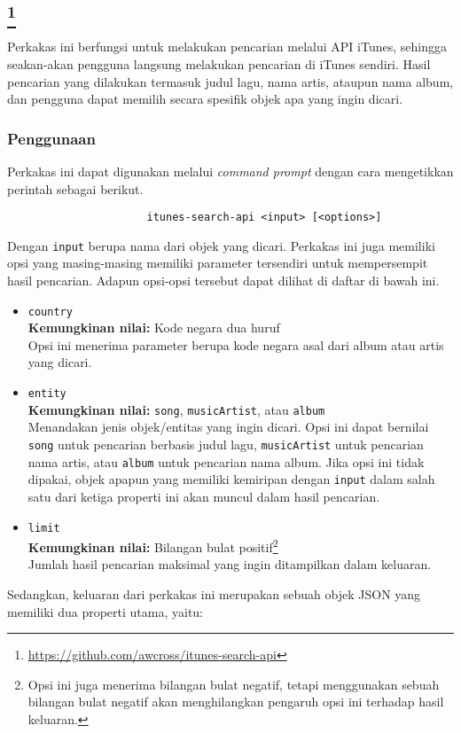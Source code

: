 \subsection{\itunesapi\footnote{\href{https://github.com/awcross/itunes-search-api}{https://github.com/awcross/itunes-search-api}}}
\label{sec:similarapps-itunesapi}

Perkakas \cl ini berfungsi untuk melakukan pencarian melalui API iTunes, sehingga seakan-akan pengguna langsung melakukan pencarian di iTunes sendiri. Hasil pencarian yang dilakukan termasuk judul lagu, nama artis, ataupun nama album, dan pengguna dapat memilih secara spesifik objek apa yang ingin dicari.

\subsubsection{Penggunaan}
\label{sec:similarapps-itunesapi-usage}

Perkakas ini dapat digunakan melalui \textit{command prompt} dengan cara mengetikkan perintah sebagai berikut.

\begin{verbatim}
                      itunes-search-api <input> [<options>]
\end{verbatim}

Dengan \verb|input| berupa nama dari objek yang dicari. Perkakas ini juga memiliki opsi yang masing-masing memiliki parameter tersendiri untuk mempersempit hasil pencarian. Adapun opsi-opsi tersebut dapat dilihat di daftar di bawah ini.

\begin{itemize}
	\item \verb|country|\\
	\textbf{Kemungkinan nilai:} Kode negara dua huruf\\
	Opsi ini menerima parameter berupa kode negara asal dari album atau artis yang dicari.
	\item \verb|entity|\\
	\textbf{Kemungkinan nilai:} \verb|song|, \verb|musicArtist|, atau \verb|album|\\
	Menandakan jenis objek/entitas yang ingin dicari. Opsi ini dapat bernilai \verb|song| untuk pencarian berbasis judul lagu, \verb|musicArtist| untuk pencarian nama artis, atau \verb|album| untuk pencarian nama album. Jika opsi ini tidak dipakai, objek apapun yang memiliki kemiripan dengan \verb|input| dalam salah satu dari ketiga properti ini akan muncul dalam hasil pencarian.
	\item \verb|limit|\\
	\textbf{Kemungkinan nilai:} Bilangan bulat positif\footnote{Opsi ini juga menerima bilangan bulat negatif, tetapi menggunakan sebuah bilangan bulat negatif akan menghilangkan pengaruh opsi ini terhadap hasil keluaran.}\\
	Jumlah hasil pencarian maksimal yang ingin ditampilkan dalam keluaran.
\end{itemize}
\vspace{\baselineskip}
Sedangkan, keluaran dari perkakas ini merupakan sebuah objek JSON yang memiliki dua properti utama, yaitu:

